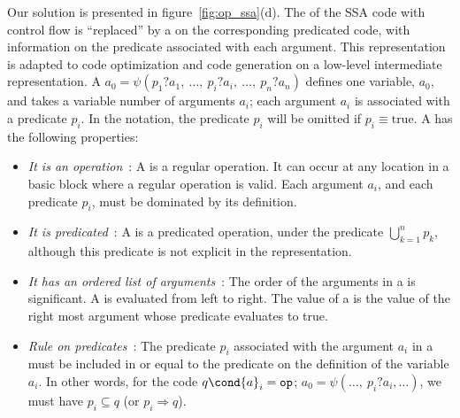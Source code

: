 Our solution is presented in figure~\ref{fig:op_ssa}(d). The \phifun of the SSA code with control flow
is ``replaced'' by a \psifun{}\index{\psifun} on the corresponding predicated code, with information on the
predicate associated with each argument. This representation is
adapted to code optimization and code generation on a low-level
intermediate representation.
%
A \psifun ${a_0 = \psi({p}_1?{a}_1,\ \dots,\ {p}_i?{a}_i,\
  \dots,\ {p}_n?{a}_n)}$ defines one variable, ${a_0}$,
and takes a variable number of arguments ${a_i}$; each
argument ${a_i}$ is associated with a predicate ${p_i}$. In
the notation, the predicate ${p_i}$ will be omitted if
${p_i} \equiv \textrm{true}$.
\newpage
A \psifun has the following properties:
\begin{itemize}

\item{\emph{It is an operation}}~: A \psifun is a regular operation. It
  can occur at any location in a basic block where a regular operation
  is valid. Each argument ${a_i}$, and each predicate ${p_i}$,
  must be dominated by its definition.

\item{\emph{It is predicated}}~: A \psifun is a predicated
  operation, under the predicate ${\bigcup_{k=1}^n p_k}$,
  although this predicate is not explicit in the representation.

\item{\emph{It has an ordered list of arguments}}~: The order of the
  arguments in a \psifun is significant. A \psifun is
  evaluated from left to right. The value of a \psifun is the
  value of the right most argument whose predicate evaluates to true.

\item{\emph{Rule on predicates}}~: The predicate ${p_i}$ associated
  with the argument ${a_i}$ in a \psifun must be included
  in or equal to the predicate on the definition of the variable ${a_i}$.
In other words, for the code $q\cond {a}_i = \texttt{op}$;  ${a}_0 = {\psi}(\dots,\ {p}_i?{a}_i,\dots)$, we must have 
${p}_i \subseteq {q}$ (or $p_i \Rightarrow q$).

\end{itemize}

